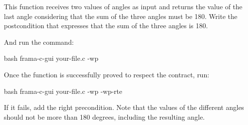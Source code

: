 


This function receives two values of angles as input and returns the value
of the last angle considering that the sum of the three angles must be 180.
Write the postcondition that expresses that the sum of the three angles is
180.





And run the command:


\begin{CodeBlock}{bash}
frama-c-gui your-file.c -wp
\end{CodeBlock}


Once the function is successfully proved to respect the contract, run:


\begin{CodeBlock}{bash}
frama-c-gui your-file.c -wp -wp-rte
\end{CodeBlock}



If it fails, add the right precondition. Note that the values of the different
angles should not be more than 180 degrees, including the resulting angle.


